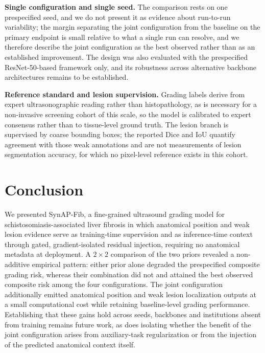 \textbf{Single configuration and single seed.} The comparison rests on one
prespecified seed, and we do not present it as evidence about run-to-run
variability; the margin separating the joint configuration from the baseline on
the primary endpoint is small relative to what a single run can resolve, and we
therefore describe the joint configuration as the best observed rather than as an
established improvement. The design was also evaluated with the prespecified
ResNet-50-based framework only, and its robustness across alternative backbone
architectures remains to be established.

\textbf{Reference standard and lesion supervision.} Grading labels derive from
expert ultrasonographic reading rather than histopathology, as is necessary for a
non-invasive screening cohort of this scale, so the model is calibrated to expert
consensus rather than to tissue-level ground truth. The lesion branch is
supervised by coarse bounding boxes; the reported Dice and IoU quantify agreement
with those weak annotations and are not measurements of lesion segmentation
accuracy, for which no pixel-level reference exists in this cohort.

\section{Conclusion}
\label{sec:conclusion}

We presented SynAP-Fib, a fine-grained ultrasound grading model for
schistosomiasis-associated liver fibrosis in which anatomical position and weak
lesion evidence serve as training-time supervision and as inference-time context
through gated, gradient-isolated residual injection, requiring no anatomical
metadata at deployment. A $2\times2$ comparison of the two priors revealed a
non-additive empirical pattern: either prior alone degraded the prespecified
composite grading risk, whereas their combination did not and attained the best
observed composite risk among the four configurations. The joint configuration
additionally emitted anatomical position and weak lesion localization outputs at
a small computational cost while retaining baseline-level grading performance.
Establishing that these gains hold across seeds, backbones and institutions
absent from training remains future work, as does isolating whether the benefit
of the joint configuration arises from auxiliary-task regularization or from the
injection of the predicted anatomical context itself.
